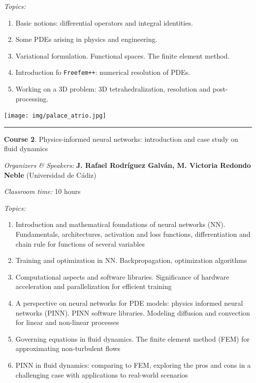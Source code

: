 \documentclass[
]{article}
\providecommand{\tightlist}{%
  \setlength{\itemsep}{0pt}\setlength{\parskip}{0pt}}
\begin{document}
\emph{Topics:} \textbf{}

\begin{enumerate}
\tightlist
\item
  Basic notions: differential operators and integral identities.
\item
  Some PDEs arising in physics and engineering.
\item
  Variational formulation. Functional spaces. The finite element method.
\item
  Introduction fo \texttt{Freefem++}: numerical resolution of PDEs.
\item
  Working on a 3D problem: 3D tetrahedralization, resolution and
  post-processing.
\end{enumerate}

\texttt{[image: img/palace\_atrio.jpg]}

\begin{center}\rule{0.5\linewidth}{0.5pt}\end{center}

\textbf{Course 2}. Physics-informed neural networks: introduction and
case study on fluid dynamics

\emph{Organizers \& Speakers:} \textbf{J. Rafael Rodríguez Galván, M.
Victoria Redondo Neble} (Universidad de Cádiz)

\emph{Classroom time:} \textbf{} 10 hours

\emph{Topics:} \textbf{}

\begin{enumerate}
\tightlist
\item
  Introduction and mathematical foundations of neural networks (NN).
  Fundamentals, architectures, activation and loss functions,
  differentiation and chain rule for functions of several variables
\item
  Training and optimization in NN. Backpropagation, optimization
  algorithms
\item
  Computational aspects and software libraries. Significance of hardware
  acceleration and parallelization for efficient training
\item
  A perspective on neural networks for PDE models: physics informed
  neural networks (PINN). PINN software libraries. Modeling diffusion
  and convection for linear and non-linear processes
\item
  Governing equations in fluid dynamics. The finite element method (FEM)
  for approximating non-turbulent flows
\item
  PINN in fluid dynamics: comparing to FEM, exploring the pros and cons
  in a challenging case with applications to real-world scenarios
\end{enumerate}
\end{document}

